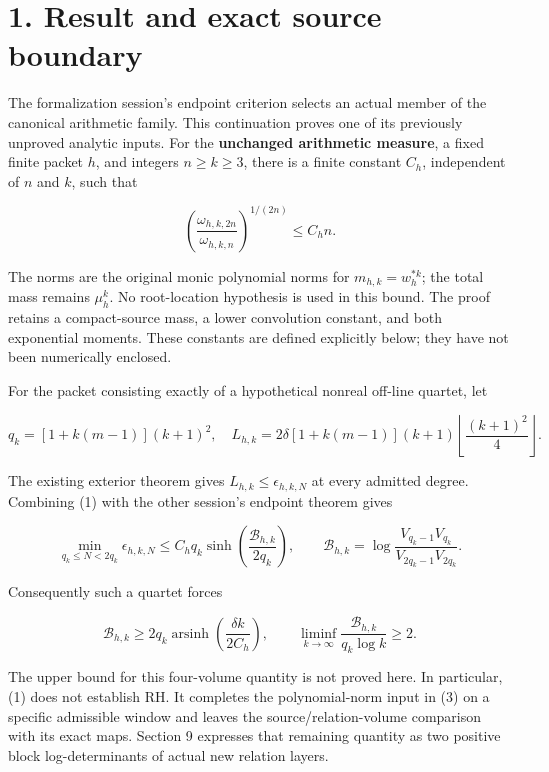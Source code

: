 


{
\setcounter{tocdepth}{3}

}
\section{1. Result and exact source
boundary}\label{result-and-exact-source-boundary}

The formalization session's endpoint criterion selects an actual member
of the canonical arithmetic family. This continuation proves one of its
previously unproved analytic inputs. For the \textbf{unchanged
arithmetic measure}, a fixed finite packet \(h\), and integers
\(n\ge k\ge3\), there is a finite constant \(C_h\), independent of \(n\)
and \(k\), such that

\[
 \boxed{\left(\frac{\omega_{h,k,2n}}{\omega_{h,k,n}}\right)^{1/(2n)}
       \le C_h n.}                                                    \tag{1}
\]

The norms are the original monic polynomial norms for
\(m_{h,k}=w_h^{*k}\); the total mass remains \(\mu_h^k\). No
root-location hypothesis is used in this bound. The proof retains a
compact-source mass, a lower convolution constant, and both exponential
moments. These constants are defined explicitly below; they have not
been numerically enclosed.

For the packet consisting exactly of a hypothetical nonreal off-line
quartet, let

\[
 q_k=[1+k(m-1)](k+1)^2,
 \quad
 L_{h,k}=2\delta[1+k(m-1)](k+1)
                 \left\lfloor\frac{(k+1)^2}{4}\right\rfloor.             \tag{2}
\]

The existing exterior theorem gives \(L_{h,k}\le\epsilon_{h,k,N}\) at
every admitted degree. Combining (1) with the other session's endpoint
theorem gives

\[
 \boxed{\min_{q_k\le N<2q_k}\epsilon_{h,k,N}
 \le C_hq_k\sinh\!\left(\frac{\mathcal B_{h,k}}{2q_k}\right),\qquad
 \mathcal B_{h,k}=\log\frac{V_{q_k-1}V_{q_k}}
                              {V_{2q_k-1}V_{2q_k}}.}                    \tag{3}
\]

Consequently such a quartet forces

\[
 \boxed{\mathcal B_{h,k}\ge
 2q_k\operatorname{arsinh}\!\left(\frac{\delta k}{2C_h}\right),\qquad
 \liminf_{k\to\infty}\frac{\mathcal B_{h,k}}{q_k\log k}\ge2.}           \tag{4}
\]

The upper bound for this four-volume quantity is not proved here. In
particular, (1) does not establish RH. It completes the polynomial-norm
input in (3) on a specific admissible window and leaves the
source/relation-volume comparison with its exact maps. Section 9
expresses that remaining quantity as two positive block log-determinants
of actual new relation layers.

